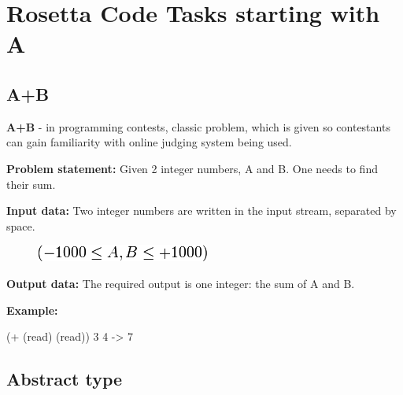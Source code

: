 %
%
%

\chapter{Rosetta Code Tasks starting with A}
\label{rosettacode-numbers}

\section*{A+B}

\textbf{A+B} - in programming contests, classic problem, which is given
so contestants can gain familiarity with online judging system being
used.

\textbf{Problem statement:} Given 2 integer numbers, A and B. One
needs to find their sum.

\textbf{Input data:} Two integer numbers are written in the input
stream, separated by space.

\begin{figure}[H]
\centering
\includegraphics[scale=.6]{graphics/a344abb2a9a00cb2de6679a485115ce3.png}
\end{figure}

\textbf{Output data:} The required output is one integer: the sum of A
and B.

\textbf{Example:}




\begin{wideverbatim}

(+ (read) (read))
3 4
-> 7

\end{wideverbatim}

\pagebreak{}
\section*{Abstract type}

